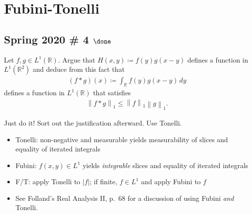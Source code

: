 \hypertarget{fubini-tonelli}{%
\section{Fubini-Tonelli}\label{fubini-tonelli}}

\hypertarget{spring-2020-4-done}{%
\subsection{\texorpdfstring{Spring 2020 \# 4
\(\done\)}{Spring 2020 \# 4 \textbackslash done}}\label{spring-2020-4-done}}

Let \(f, g\in L^1({\mathbb{R}})\). Argue that
\(H(x, y) \coloneqq f(y) g(x-y)\) defines a function in
\(L^1({\mathbb{R}}^2)\) and deduce from this fact that
\begin{align*}
(f\ast g)(x) \coloneqq\int_{\mathbb{R}}f(y) g(x-y) \,dy
\end{align*}
defines a function in \(L^1({\mathbb{R}})\) that satisfies
\begin{align*}
{\left\lVert {f\ast g} \right\rVert}_1 \leq {\left\lVert {f} \right\rVert}_1 {\left\lVert {g} \right\rVert}_1
.\end{align*}

\begin{strategy}

Just do it! Sort out the justification afterward. Use Tonelli.

\end{strategy}

\begin{concept}

\envlist

\begin{itemize}
\tightlist
\item
  Tonelli: non-negative and measurable yields measurability of slices
  and equality of iterated integrals
\item
  Fubini: \(f(x, y) \in L^1\) yields \emph{integrable} slices and
  equality of iterated integrals
\item
  F/T: apply Tonelli to \({\left\lvert {f} \right\rvert}\); if finite,
  \(f\in L^1\) and apply Fubini to \(f\)
\item
  See Folland's Real Analysis II, p.~68 for a discussion of using Fubini
  \emph{and} Tonelli.
\end{itemize}

\end{concept}

